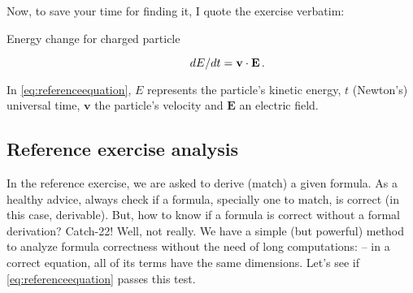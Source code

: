 Now, to save your time for finding it, I quote the exercise verbatim:
%
\begin{description}
%
\item[Energy change for charged particle] 
%
\begin{equation}\label{eq:referenceequation}
  dE/dt = \mathbf{v}\cdot\mathbf{E}\,.
\end{equation}
%
\end{description}
%
In \cref{eq:referenceequation}, $E$ represents the particle's kinetic energy, $t$ (Newton's) universal time, $\mathbf{v}$ the particle's velocity and $\mathbf{E}$ an electric field.


\subsection{Reference exercise analysis}\label{sec:referenceanalysis}
%
In the reference exercise, we are asked to derive (match) a given formula. As a healthy advice, always check if a formula, specially one to match, is correct (in this case, derivable). But, how to know if a formula is correct without a formal derivation? Catch-22! Well, not really. We have a simple (but powerful) method to analyze formula correctness without the need of long computations: 
%
%
-- in a correct equation, all of its terms have the same dimensions. Let's see if \cref{eq:referenceequation} passes this test.

